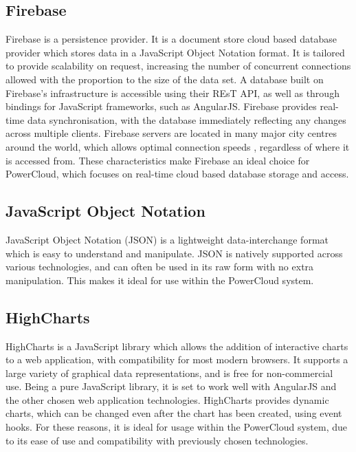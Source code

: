 \documentclass{article}
\begin{document}
	\subsection{Firebase}
	
	Firebase is a persistence provider. It is a document store cloud 
	based database provider which stores data in a JavaScript Object 
	Notation format. It is tailored to provide scalability on request, 
	increasing the number of concurrent connections allowed with the 
	proportion to the size of the data set. A database built on 
	Firebase's infrastructure is accessible using their REsT API, as well 
	as through bindings for JavaScript frameworks, such as AngularJS. 
	Firebase provides real-time data synchronisation, with the database 
	immediately reflecting any changes across multiple clients. Firebase 
	servers are located in many major city centres around the world, 
	which allows optimal connection speeds , regardless of where it is 
	accessed from. These characteristics make Firebase an ideal choice 
	for PowerCloud, which focuses on real-time cloud based database 
	storage and access.
	
	\subsection{JavaScript Object Notation}
	
	JavaScript Object Notation (JSON) is a lightweight data-interchange 
	format which is easy to understand and manipulate. JSON is natively 
	supported across various technologies, and can often be used in its 
	raw form with no extra manipulation. This makes it ideal for use 
	within the PowerCloud system.
	
	\subsection{HighCharts}
	
	HighCharts is a JavaScript library which allows the addition of 
	interactive charts to a web application, with compatibility for most 
	modern browsers. It supports a large variety of graphical data 
	representations, and is free for non-commercial use. Being a pure 
	JavaScript library, it is set to work well with AngularJS and the 
	other chosen web application technologies. HighCharts provides 
	dynamic charts, which can be changed even after the chart has been 
	created, using event hooks. For these reasons, it is ideal for usage 
	within the PowerCloud system, due to its ease of use and 
	compatibility with previously chosen technologies. 
\end{document}
